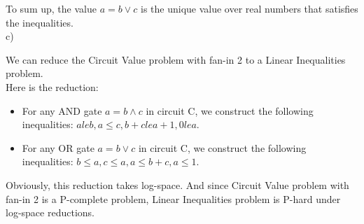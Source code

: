 \documentclass[12pt]{article}
\begin{document}
To sum up, the value $a = b \lor c$ is the unique value over real
numbers that satisfies the inequalities. \\

c)

We can reduce the Circuit Value problem with fan-in 2 to a Linear
Inequalities problem. \\

Here is the reduction: 

\begin{itemize}
\item For any AND gate $a = b \land c$ in circuit C, we construct the
  following inequalities: $a le b, a \le c, b + c le a + 1, 0 le a$.
\item For any OR gate $a = b \lor c$ in circuit C, we construct the
  following inequalities: $b \le a, c \le a, a \le b + c, a \le 1$.
\end{itemize}

Obviously, this reduction takes log-space. And since Circuit Value
problem with fan-in 2 is a P-complete problem, Linear Inequalities
problem is P-hard under log-space reductions.
\end{document}
